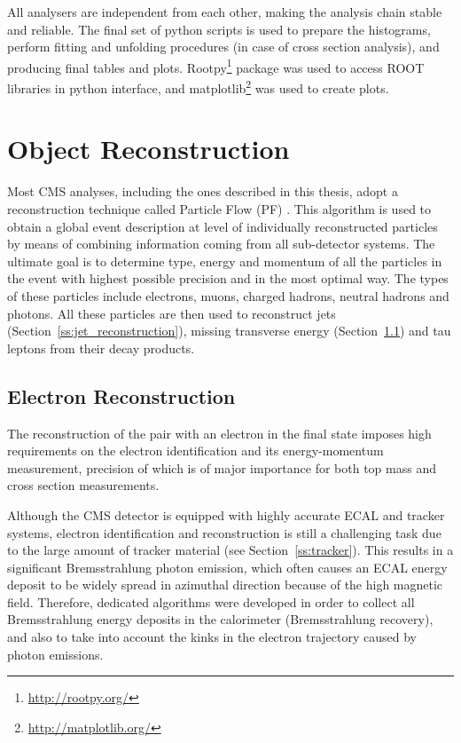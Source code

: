 All analysers are independent from each other, making the analysis chain stable and reliable. The final set of python
scripts is used to prepare the histograms, perform fitting and unfolding procedures (in case of cross section analysis),
and producing final tables and plots. Rootpy\footnote{\url{http://rootpy.org/}} package was used to access ROOT
libraries in python interface, and matplotlib\footnote{\url{http://matplotlib.org/}} was used to create plots.

\section{Object Reconstruction}
\label{s:object_reconstruction}
Most CMS analyses, including the ones described in this thesis, adopt a reconstruction technique called Particle Flow
(PF) \cite{PF}. This algorithm is used to obtain a global event description at level of individually reconstructed
particles by means of combining information coming from all sub-detector systems. The ultimate goal is to determine
type, energy and momentum of all the particles in the event with highest possible precision and in the most optimal way.
The types of these particles include electrons, muons, charged hadrons, neutral hadrons and photons. All these particles
are then used to reconstruct jets (Section~\ref{ss:jet_reconstruction}), missing transverse energy
(Section~\ref{ss:electron_reconstruction}) and tau leptons from their decay products.

\subsection{Electron Reconstruction}
\label{ss:electron_reconstruction}
The reconstruction of the \ttbar pair with an electron in the final state imposes high requirements on the electron
identification and its energy-momentum measurement, precision of which is of major importance for both top mass and
\ttbar cross section measurements.

Although the CMS detector is equipped with highly accurate ECAL and tracker systems, electron identification and
reconstruction is still a challenging task due to the large amount of tracker material (see Section~\ref{ss:tracker}).
This results in a significant Bremsstrahlung photon emission, which often causes an ECAL energy deposit to be widely
spread in azimuthal direction because of the high magnetic field. Therefore, dedicated algorithms were developed in
order to collect all Bremsstrahlung energy deposits in the calorimeter (Bremsstrahlung recovery), and also to take into
account the kinks in the electron trajectory caused by photon emissions.


